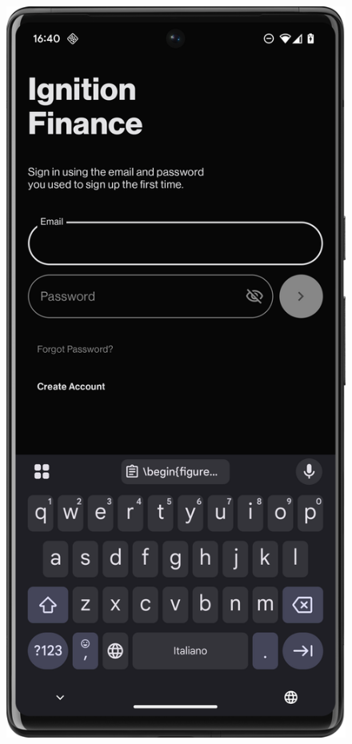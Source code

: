 \begin{figure}[H]
\begin{minipage}{0.24\textwidth}
        \label{fig:intro_screen}
    \end{minipage}
    \hfill
    \begin{minipage}{0.24\textwidth}
        \centering
        \includegraphics[width=\textwidth]{foto/login}

\end{minipage}
\end{figure}
